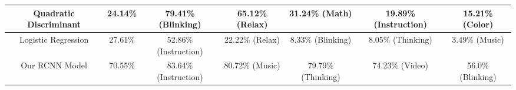 \begin{table}[]
{\begin{tabular}{|c|c|c|c|c|c|c|}
Quadratic Discriminant & 24.14\%                                                    & 79.41\% (Blinking)                                       & 65.12\% (Relax)                                          & 31.24\% (Math)                                           & 19.89\% (Instruction)                                    & 15.21\% (Color)                                          \\ \hline
Logistic Regression    & 27.61\%                                                    & 52.86\% (Instruction)                                    & 22.22\% (Relax)                                          & 8.33\% (Blinking)                                        & 8.05\% (Thinking)                                        & 3.49\% (Music)                                           \\ \hline
Our RCNN Model         & 70.55\%                                                    & 83.64\% (Instruction)                                    & 80.72\% (Music)                                          & 79.79\% (Thinking)                                       & 74.23\% (Video)                                          & 56.0\% (Blinking)                                        \\ \hline
\end{tabular}
}
\end{table}


